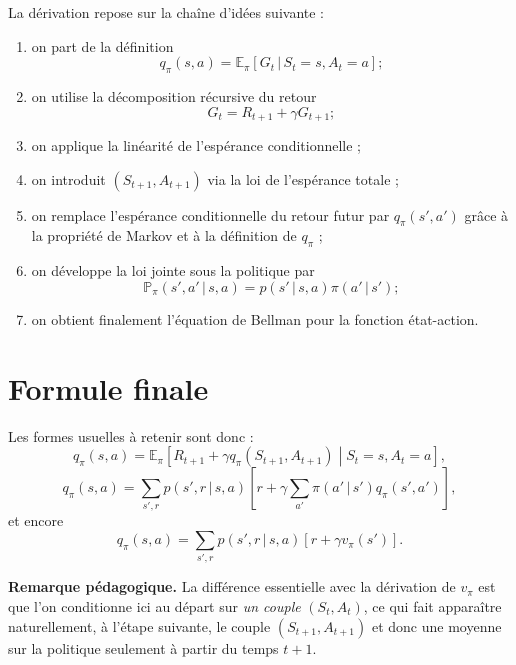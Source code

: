 \documentclass[11pt,a4paper]{article}
\newcommand{\E}{\mathbb{E}}
\newcommand{\Pbb}{\mathbb{P}}
\newcommand{\given}{\,|\,}
\begin{document}
La dérivation repose sur la chaîne d'idées suivante :
\begin{enumerate}[leftmargin=1.8em]
    \item on part de la définition
    \[
    q_{\pi}(s,a)=\E_{\pi}[G_t \given S_t=s,A_t=a];
    \]
    \item on utilise la décomposition récursive du retour
    \[
    G_t = R_{t+1} + \gamma G_{t+1};
    \]
    \item on applique la linéarité de l'espérance conditionnelle ;
    \item on introduit $(S_{t+1},A_{t+1})$ via la loi de l'espérance totale ;
    \item on remplace l'espérance conditionnelle du retour futur par $q_{\pi}(s',a')$ grâce à la propriété de Markov et à la définition de $q_{\pi}$ ;
    \item on développe la loi jointe sous la politique par
    \[
    \Pbb_{\pi}(s',a'\given s,a)=p(s'\given s,a)\pi(a'\given s');
    \]
    \item on obtient finalement l'équation de Bellman pour la fonction état-action.
\end{enumerate}

\section{Formule finale}

Les formes usuelles à retenir sont donc :
\[
q_{\pi}(s,a) = \E_{\pi}\!\left[R_{t+1} + \gamma q_{\pi}(S_{t+1},A_{t+1}) \middle\vert S_t=s, A_t=a\right],
\]
\[
q_{\pi}(s,a)
= \sum_{s',r} p(s',r \given s,a)
\left[r + \gamma \sum_{a'} \pi(a'\given s') q_{\pi}(s',a')\right],
\]
et encore
\[
q_{\pi}(s,a)
= \sum_{s',r} p(s',r \given s,a)\left[r + \gamma v_{\pi}(s')\right].
\]

\vspace{0.8em}

\noindent\textbf{Remarque pédagogique.} La différence essentielle avec la dérivation de $v_{\pi}$ est que l'on conditionne ici au départ sur \emph{un couple} $(S_t,A_t)$, ce qui fait apparaître naturellement, à l'étape suivante, le couple $(S_{t+1},A_{t+1})$ et donc une moyenne sur la politique seulement à partir du temps $t+1$.
\end{document}
